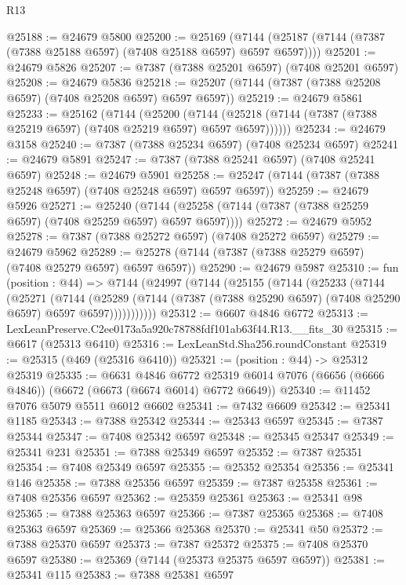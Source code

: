 \begin{lexlean}{R13}
\begin{coremodule}
@25188 := @24679 @5800
@25200 := @25169
    (@7144 (@25187 (@7144 (@7387 (@7388 @25188 @6597) (@7408 @25188 @6597) @6597 @6597))))
@25201 := @24679 @5826
@25207 := @7387 (@7388 @25201 @6597) (@7408 @25201 @6597)
@25208 := @24679 @5836
@25218 := @25207 (@7144 (@7387 (@7388 @25208 @6597) (@7408 @25208 @6597) @6597 @6597))
@25219 := @24679 @5861
@25233 := @25162
    (@7144
      (@25200
        (@7144 (@25218 (@7144 (@7387 (@7388 @25219 @6597) (@7408 @25219 @6597) @6597 @6597))))))
@25234 := @24679 @3158
@25240 := @7387 (@7388 @25234 @6597) (@7408 @25234 @6597)
@25241 := @24679 @5891
@25247 := @7387 (@7388 @25241 @6597) (@7408 @25241 @6597)
@25248 := @24679 @5901
@25258 := @25247 (@7144 (@7387 (@7388 @25248 @6597) (@7408 @25248 @6597) @6597 @6597))
@25259 := @24679 @5926
@25271 := @25240
    (@7144 (@25258 (@7144 (@7387 (@7388 @25259 @6597) (@7408 @25259 @6597) @6597 @6597))))
@25272 := @24679 @5952
@25278 := @7387 (@7388 @25272 @6597) (@7408 @25272 @6597)
@25279 := @24679 @5962
@25289 := @25278 (@7144 (@7387 (@7388 @25279 @6597) (@7408 @25279 @6597) @6597 @6597))
@25290 := @24679 @5987
@25310 := fun (position : @44) =>
  @7144
    (@24997
      (@7144
        (@25155
          (@7144
            (@25233
              (@7144
                (@25271
                  (@7144
                    (@25289
                      (@7144 (@7387 (@7388 @25290 @6597) (@7408 @25290 @6597) @6597 @6597)))))))))))
@25312 := @6607 @4846 @6772
@25313 := LexLeanPreserve.C2ee0173a5a920c78788fdf101ab63f44.R13.__fits_30
@25315 := @6617 (@25313 @6410)
@25316 := LexLeanStd.Sha256.roundConstant
@25319 := @25315 (@469 (@25316 @6410))
@25321 := (position : @44) -> @25312 @25319
@25335 := @6631
    @4846
    @6772
    @25319
    @6014
    @7076
    (@6656 (@6666 @4846))
    (@6672 (@6673 (@6674 @6014) @6772 @6649))
@25340 := @11452 @7076 @5079 @5511 @6012 @6602
@25341 := @7432 @6609
@25342 := @25341 @1185
@25343 := @7388 @25342
@25344 := @25343 @6597
@25345 := @7387 @25344
@25347 := @7408 @25342 @6597
@25348 := @25345 @25347
@25349 := @25341 @231
@25351 := @7388 @25349 @6597
@25352 := @7387 @25351
@25354 := @7408 @25349 @6597
@25355 := @25352 @25354
@25356 := @25341 @146
@25358 := @7388 @25356 @6597
@25359 := @7387 @25358
@25361 := @7408 @25356 @6597
@25362 := @25359 @25361
@25363 := @25341 @98
@25365 := @7388 @25363 @6597
@25366 := @7387 @25365
@25368 := @7408 @25363 @6597
@25369 := @25366 @25368
@25370 := @25341 @50
@25372 := @7388 @25370 @6597
@25373 := @7387 @25372
@25375 := @7408 @25370 @6597
@25380 := @25369 (@7144 (@25373 @25375 @6597 @6597))
@25381 := @25341 @115
@25383 := @7388 @25381 @6597

\end{coremodule}
\end{lexlean}
